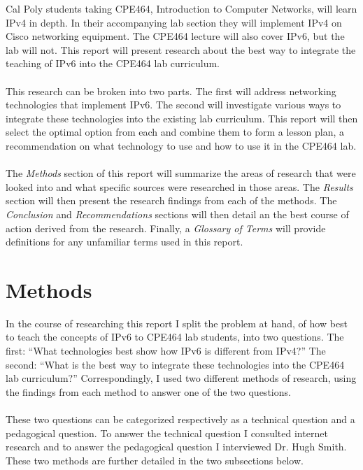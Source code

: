 \documentclass[12pt]{article}
\begin{document}
\noindent Cal Poly students taking CPE464, Introduction to Computer Networks, will learn IPv4 in depth. In their accompanying lab section they will implement IPv4 on Cisco networking equipment. The CPE464 lecture will also cover IPv6, but the lab will not. This report will present research about the best way to integrate the teaching of IPv6 into the CPE464 lab curriculum.\\\\
This research can be broken into two parts. The first will address networking technologies that implement IPv6. The second will investigate various ways to integrate these technologies into the existing lab curriculum. This report will then select the optimal option from each and combine them to form a lesson plan, a recommendation on what technology to use and how to use it in the CPE464 lab.\\\\
The \textit{Methods} section of this report will summarize the areas of research that were looked into and what specific sources were researched in those areas. The \textit{Results} section will then present the research findings from each of the methods. The \textit{Conclusion} and \textit{Recommendations} sections will then detail an the best course of action derived from the research. Finally, a \textit{Glossary of Terms} will provide definitions for any unfamiliar terms used in this report.

\section{Methods}
In the course of researching this report I split the problem at hand, of how best to teach the concepts of IPv6 to CPE464 lab students, into two questions. The first: ``What technologies best show how IPv6 is different from IPv4?'' The second: ``What is the best way to integrate these technologies into the CPE464 lab curriculum?'' Correspondingly, I used two different methods of research, using the findings from each method to answer one of the two questions.\\\\
These two questions can be categorized respectively as a technical question and a pedagogical question. To answer the technical question I consulted internet research and to answer the pedagogical question I interviewed Dr. Hugh Smith. These two methods are further detailed in the two subsections below.
\end{document}
